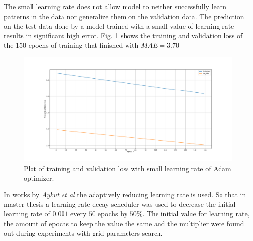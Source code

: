 The small learning rate does not allow model to neither successfully learn patterns in the data nor generalize them on the validation data. The prediction on the test data done by a model trained with a small value of learning rate results in significant high error. Fig. \ref{fig:lr} shows the training and validation loss of the 150 epochs of training that finished with $MAE = 3.70$
\begin{figure}[htb]
	\begin{center}
		\includegraphics[width=1\textwidth, keepaspectratio]{gfx/lstm1_lr_low.pdf}
		\caption{\label{fig:lr} Plot of training and validation loss with small learning rate of Adam optimizer.}
	\end{center}
\end{figure}

In works \cite{delay_compensation_360, telepresence} by \textit{Aykut et al} the adaptively reducing learning rate is used. So that in master thesis a learning rate decay scheduler was used to decrease the initial learning rate of $0.001$ every $50$ epochs by $50\%$. The initial value for learning rate, the amount of epochs to keep the value the same and the multiplier were found out during experiments with grid parameters search. 

